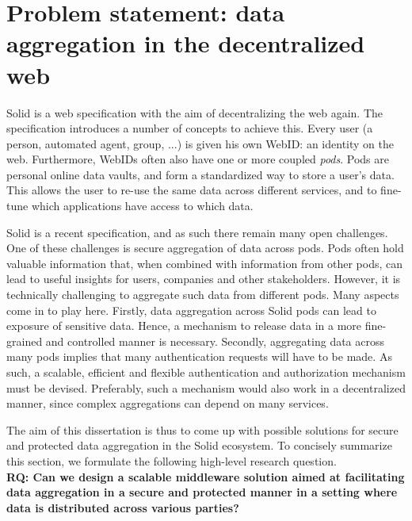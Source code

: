 \section{Problem statement: data aggregation in the decentralized web}
\label{sec:problem}
 Solid is a web specification with the aim of decentralizing the web again. The specification introduces a number of concepts to achieve this. Every user (a person, automated agent, group, ...) is given his own WebID: an identity on the web. Furthermore, WebIDs often also have one or more coupled \textit{pods}. Pods are personal online data vaults, and form a standardized way to store a user's data. This allows the user to re-use the same data across different services, and to fine-tune which applications have access to which data.

Solid is a recent specification, and as such there remain many open challenges. One of these challenges is secure aggregation of data across pods. Pods often hold valuable information that, when combined with information from other pods, can lead to useful insights for users, companies and other stakeholders. However, it is technically challenging to aggregate such data from different pods. Many aspects come in to play here. Firstly, data aggregation across Solid pods can lead to exposure of sensitive data. Hence, a mechanism to release data in a more fine-grained and controlled manner is necessary. Secondly, aggregating data across many pods implies that many authentication requests will have to be made. As such, a scalable, efficient and flexible authentication and authorization mechanism must be devised. Preferably, such a mechanism would also work in a decentralized manner, since complex aggregations can depend on many services.

The aim of this dissertation is thus to come up with possible solutions for secure and protected data aggregation in the Solid ecosystem. 
To concisely summarize this section, we formulate the following high-level research question.\\

\noindent \textbf{RQ: Can we design a scalable middleware solution aimed at facilitating data aggregation in a secure and protected manner in a setting where data is distributed across various parties?}

